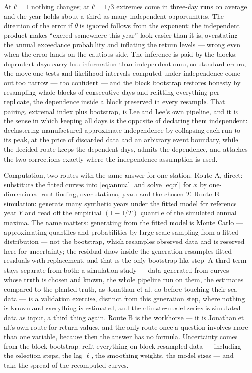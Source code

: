\documentclass[11pt]{article}
\begin{document}
{At $\theta = 1$ nothing changes; at $\theta = 1/3$ extremes come in three-day runs on average and the year holds about a third as many independent opportunities. The direction of the error if $\theta$ is ignored follows from the exponent: the independent product makes ``exceed somewhere this year'' look easier than it is, overstating the annual exceedance probability and inflating the return levels --- wrong even when the error lands on the cautious side. The inference is paid by the blocks: dependent days carry less information than independent ones, so standard errors, the move-one tests and likelihood intervals computed under independence come out too narrow --- too confident --- and the block bootstrap restores honesty by resampling whole blocks of consecutive days and refitting everything per replicate, the dependence inside a block preserved in every resample. That pairing, extremal index plus bootstrap, is Lee and Lee's own pipeline, and it is the sense in which keeping all days is the opposite of declaring them independent: declustering manufactured approximate independence by collapsing each run to its peak, at the price of discarded data and an arbitrary event boundary, while the decided route keeps the dependent days, admits the dependence, and attaches the two corrections exactly where the independence assumption is used.}

Computation, two routes with the same answer for one station. Route A, direct: substitute the fitted curves into \eqref{eq:annual} and solve \eqref{eq:rl} for $x$ by one-dimensional root finding, over stations, years and the chosen $T$. Route B, simulation: generate many synthetic years under the fitted model for reference year $Y$ and read off the empirical $(1 - 1/T)$ quantile of the simulated annual maxima. The name matters: generating from the fitted model is Monte Carlo --- approximating quantiles and probabilities by large-scale sampling from a fitted distribution --- not the bootstrap, which resamples observed data and is reserved here for uncertainty; the residual draw inside the generation resamples fitted residuals with replacement, and that is the only bootstrap-like step. {\color{blue}A third term stays separate from both: a simulation study --- data generated from curves whose truth is chosen and known, the whole pipeline run on them, the estimates compared to the planted truth, as Jonathan et al. do before touching their sea data --- is a validation exercise, distinct from this generation step, where nothing is known and everything is estimated; and the climate-model series is simulated data as input, a third thing again.} Route B is the workhorse --- it is Jonathan et al.'s own route for return values, and the only route once a question involves more than one variable, because then the answer has no formula. Uncertainty comes from the block bootstrap: refit everything on block-resampled data --- including the selection steps, the lag $\ell$, the smoothing weights, the model sizes --- and take the spread of the recomputed curves.
\end{document}
